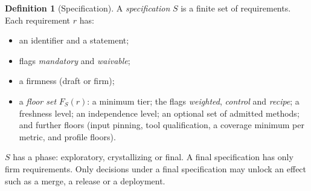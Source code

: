 \documentclass[11pt]{article}
\theoremstyle{definition}
\newtheorem{definition}{Definition}
\theoremstyle{remark}
\begin{document}
\begin{definition}[Specification]
A \emph{specification} $S$ is a finite set of requirements. Each requirement $r$ has:
\begin{itemize}[itemsep=1pt]
\item an identifier and a statement;
\item flags \emph{mandatory} and \emph{waivable};
\item a firmness (draft or firm);
\item a \emph{floor set} $F_S(r)$: a minimum tier; the flags \emph{weighted}, \emph{control} and
  \emph{recipe}; a freshness level; an independence level; an optional set of admitted methods;
  and further floors (input pinning, tool qualification, a coverage minimum per metric, and
  profile floors).
\end{itemize}
$S$ has a phase: exploratory, crystallizing or final. A final specification has only firm
requirements. Only decisions under a final specification may unlock an effect such as a merge, a
release or a deployment.
\end{definition}
\end{document}
